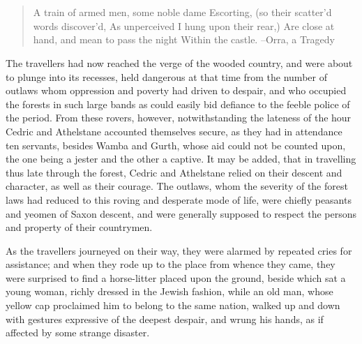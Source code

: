 \chapter{}

\begin{quote}
A train of armed men, some noble dame
Escorting, (so their scatter'd words discover'd,
As unperceived I hung upon their rear,)
Are close at hand, and mean to pass the night
Within the castle.
--Orra, a Tragedy
\end{quote}

The travellers had now reached the verge of the wooded country, and were
about to plunge into its recesses, held dangerous at that time from the
number of outlaws whom oppression and poverty had driven to despair, and
who occupied the forests in such large bands as could easily bid
defiance to the feeble police of the period. From these rovers, however,
notwithstanding the lateness of the hour Cedric and Athelstane accounted
themselves secure, as they had in attendance ten servants, besides Wamba
and Gurth, whose aid could not be counted upon, the one being a jester
and the other a captive. It may be added, that in travelling thus late
through the forest, Cedric and Athelstane relied on their descent and
character, as well as their courage. The outlaws, whom the severity of
the forest laws had reduced to this roving and desperate mode of life,
were chiefly peasants and yeomen of Saxon descent, and were generally
supposed to respect the persons and property of their countrymen.

As the travellers journeyed on their way, they were alarmed by repeated
cries for assistance; and when they rode up to the place from whence
they came, they were surprised to find a horse-litter placed upon the
ground, beside which sat a young woman, richly dressed in the Jewish
fashion, while an old man, whose yellow cap proclaimed him to belong to
the same nation, walked up and down with gestures expressive of the
deepest despair, and wrung his hands, as if affected by some strange
disaster.

